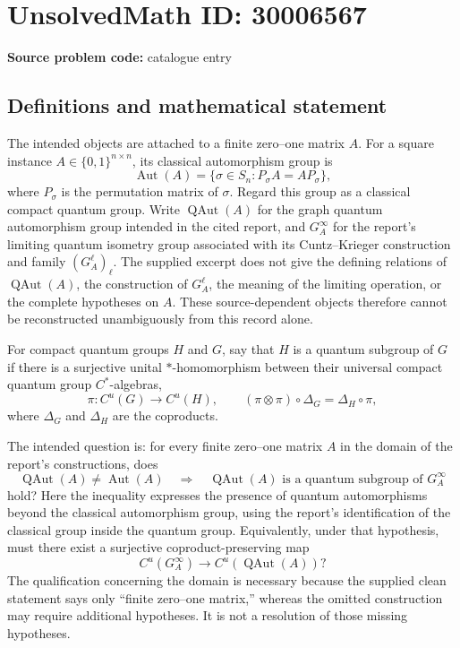 \documentclass[11pt]{article}
\begin{document}
\section*{UnsolvedMath ID: 30006567}
\textbf{Source problem code:} catalogue entry
\subsection{Definitions and mathematical statement}
The intended objects are attached to a finite zero--one matrix \(A\). For a square instance \(A\in\{0,1\}^{n\times n}\), its classical automorphism group is
\[
\operatorname{Aut}(A)=\{\sigma\in S_n:P_\sigma A=AP_\sigma\},
\]
where \(P_\sigma\) is the permutation matrix of \(\sigma\). Regard this group as a classical compact quantum group. Write \(\operatorname{QAut}(A)\) for the graph quantum automorphism group intended in the cited report, and \(G_A^\infty\) for the report's limiting quantum isometry group associated with its Cuntz--Krieger construction and family \((G_A^\ell)_\ell\). The supplied excerpt does not give the defining relations of \(\operatorname{QAut}(A)\), the construction of \(G_A^\ell\), the meaning of the limiting operation, or the complete hypotheses on \(A\). These source-dependent objects therefore cannot be reconstructed unambiguously from this record alone.

For compact quantum groups \(H\) and \(G\), say that \(H\) is a quantum subgroup of \(G\) if there is a surjective unital \(*\)-homomorphism between their universal compact quantum group \(C^*\)-algebras,
\[
\pi:C^u(G)\longrightarrow C^u(H),
\qquad
(\pi\otimes\pi)\circ\Delta_G=\Delta_H\circ\pi,
\]
where \(\Delta_G\) and \(\Delta_H\) are the coproducts.

The intended question is: for every finite zero--one matrix \(A\) in the domain of the report's constructions, does
\[
\operatorname{QAut}(A)\ne\operatorname{Aut}(A)
\quad\Longrightarrow\quad
\operatorname{QAut}(A)\text{ is a quantum subgroup of }G_A^\infty
\]
hold? Here the inequality expresses the presence of quantum automorphisms beyond the classical automorphism group, using the report's identification of the classical group inside the quantum group. Equivalently, under that hypothesis, must there exist a surjective coproduct-preserving map
\[
C^u(G_A^\infty)\longrightarrow C^u(\operatorname{QAut}(A))?
\]
The qualification concerning the domain is necessary because the supplied clean statement says only ``finite zero--one matrix,'' whereas the omitted construction may require additional hypotheses. It is not a resolution of those missing hypotheses.
\end{document}
